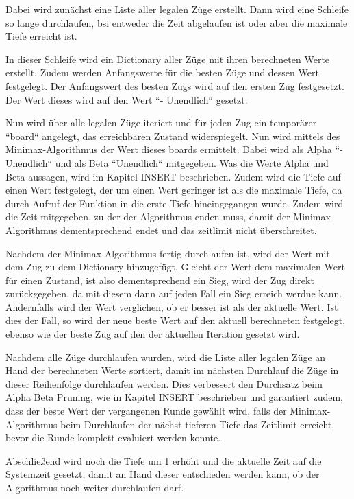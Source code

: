     Dabei wird zunächst eine Liste aller legalen Züge erstellt. Dann wird
eine Schleife so lange durchlaufen, bsi entweder die Zeit abgelaufen ist
oder aber die maximale Tiefe erreicht ist.

In dieser Schleife wird ein Dictionary aller Züge mit ihren berechneten
Werte erstellt. Zudem werden Anfangswerte für die besten Züge und dessen
Wert festgelegt. Der Anfangswert des besten Zugs wird auf den ersten Zug
festgesetzt. Der Wert dieses wird auf den Wert ``- Unendlich`` gesetzt.

Nun wird über alle legalen Züge iteriert und für jeden Zug ein
temporärer ``board`` angelegt, das erreichbaren Zustand widerspiegelt. Nun
wird mittels des Minimax-Algorithmus der Wert dieses boards ermittelt.
Dabei wird als Alpha ``- Unendlich`` und als Beta ``Unendlich`` mitgegeben.
Was die Werte Alpha und Beta aussagen, wird im Kapitel INSERT
beschrieben. Zudem wird die Tiefe auf einen Wert festgelegt, der um
einen Wert geringer ist als die maximale Tiefe, da durch Aufruf der
Funktion in die erste Tiefe hineingegangen wurde. Zudem wird die Zeit
mitgegeben, zu der der Algorithmus enden muss, damit der Minimax
Algorithmus dementsprechend endet und das zeitlimit nicht überschreitet.

Nachdem der Minimax-Algorithmus fertig durchlaufen ist, wird der Wert
mit dem Zug zu dem Dictionary hinzugefügt. Gleicht der Wert dem
maximalen Wert für einen Zustand, ist also dementsprechend ein Sieg,
wird der Zug direkt zurückgegeben, da mit diesem dann auf jeden Fall ein
Sieg erreich werdne kann. Andernfalls wird der Wert verglichen, ob er
besser ist als der aktuelle Wert. Ist dies der Fall, so wird der neue
beste Wert auf den aktuell berechneten festgelegt, ebenso wie der beste
Zug auf den der aktuellen Iteration gesetzt wird.

Nachdem alle Züge durchlaufen wurden, wird die Liste aller legalen Züge
an Hand der berechneten Werte sortiert, damit im nächsten Durchlauf die
Züge in dieser Reihenfolge durchlaufen werden. Dies verbessert den
Durchsatz beim Alpha Beta Pruning, wie in Kapitel INSERT beschrieben und
garantiert zudem, dass der beste Wert der vergangenen Runde gewählt
wird, falls der Minimax-Algorithmus beim Durchlaufen der nächst tieferen
Tiefe das Zeitlimit erreicht, bevor die Runde komplett evaluiert werden
konnte.

Abschließend wird noch die Tiefe um 1 erhöht und die aktuelle Zeit auf
die Systemzeit gesetzt, damit an Hand dieser entschieden werden kann, ob
der Algorithmus noch weiter durchlaufen darf.

